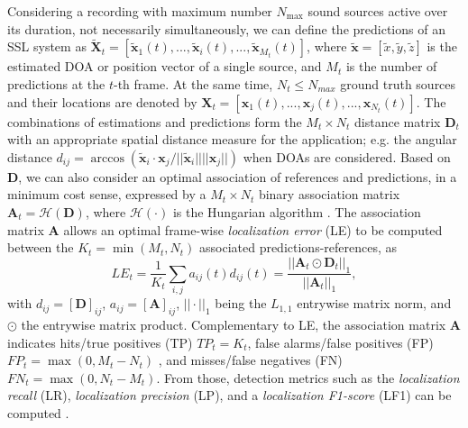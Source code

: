 \documentclass[conference]{IEEEtran}
\def\xp {\tilde{\mathbf{x}}}
\def\Xp {\tilde{\mathbf{X}}}
\def\xr {\mathbf{x}}
\def\Xr {\mathbf{X}}
\def\D {\mathbf{D}}
\def\A {\mathbf{A}}
\begin{document}
Considering a recording with maximum number $N_\mathrm{max}$ sound sources active over its duration, not necessarily simultaneously, we can define the predictions of an SSL system as $\Xp_t = [\xp_1(t), ...,\xp_i(t), ..., \xp_{M_t}(t)]$, where $\xp = [\tilde{x},\tilde{y},\tilde{z}]$ is the estimated DOA or position vector of a single source, and $M_t$ is the number of predictions at the $t$-th frame. At the same time, $N_t\leq N_{max}$ ground truth sources and their locations are denoted by  $\Xr_t = [\xr_1(t), ...,\xr_j(t), ..., \xr_{N_t}(t)]$. The combinations of estimations and predictions form the $M_t\times N_t$ distance matrix $\D_t$ with an appropriate spatial distance measure for the application; e.g. the angular distance $d_{ij} = \arccos( \xp_i\cdot \xr_j / ||\xp_i|| ||\xr_j|| )$ when DOAs are considered. Based on $\D$, we can also consider an optimal association of references and predictions, in a minimum cost sense, expressed by a $M_t \times N_t$ binary association matrix $\A_t = \mathcal{H}(\D)$, where $\mathcal{H}(\cdot)$ is the Hungarian algorithm \cite{Hungarian}. The association matrix $\A$ allows an optimal frame-wise \emph{localization error} (LE) to be computed between the $K_t=\min(M_t,N_t)$ associated predictions-references, as
\begin{equation}
    LE_t = \frac{1}{K_t}\sum_{i,j} a_{ij}(t) d_{ij}(t) = \frac{|| \A_t \odot \D_t||_1}{||\A_t||_1},
    \label{eq:le}
\end{equation}
with $d_{ij} = [\D]_{ij}$, $a_{ij} = [\A]_{ij}$, $||\cdot||_1$ being the $L_{1,1}$ entrywise matrix norm, and $\odot$ the entrywise matrix product. Complementary to LE, the association matrix $\A$ indicates hits/true positives (TP) $TP_t = K_t$, false alarms/false positives (FP) $FP_t = \max(0, M_t-N_t)$ , and misses/false negatives (FN) $FN_t = \max(0, N_t-M_t)$. From those, detection metrics such as the \emph{localization recall} (LR), \emph{localization precision} (LP), and a \emph{localization F1-score} (LF1) can be computed \cite{politis2020overview}.
\end{document}
